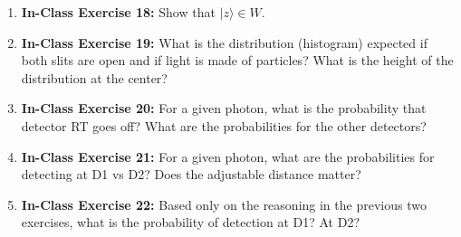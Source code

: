 \documentclass[main.tex]{subfiles}
\begin{document}
\begin{enumerate}
\item[] \textbf{In-Class Exercise 18:} Show that $|z\rangle \in W$.

\item[] \textbf{In-Class Exercise 19:} What is the distribution (histogram) expected if both slits are open and if light is made of particles? What is the height of the distribution at the center?

\item[] \textbf{In-Class Exercise 20:} For a given photon, what is the probability that detector RT goes off? What are the probabilities for the other detectors?

\item[] \textbf{In-Class Exercise 21:} For a given photon, what are the probabilities for detecting at D1 vs D2? Does the adjustable distance matter?

\item[] \textbf{In-Class Exercise 22:} Based only on the reasoning in the previous two exercises, what is the probability of detection at D1? At D2?

\end{enumerate}
\end{document}
